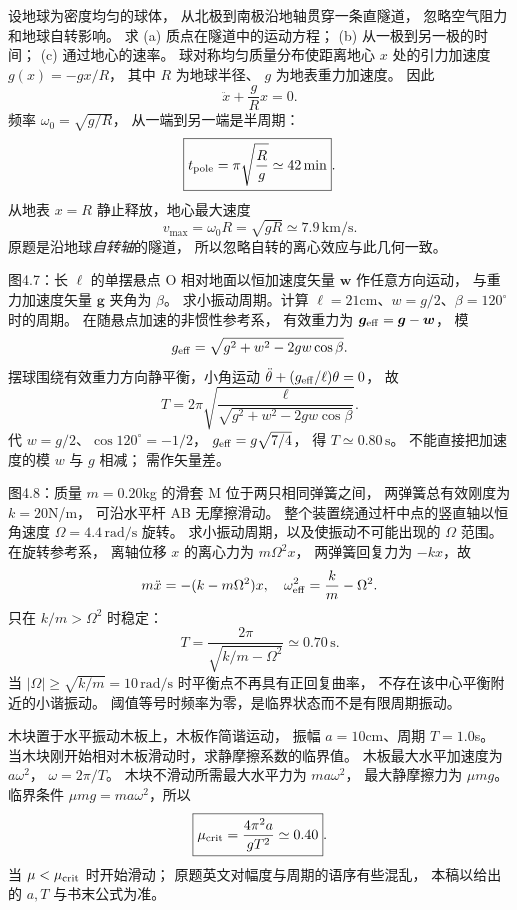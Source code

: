 设地球为密度均匀的球体，
从北极到南极沿地轴贯穿一条直隧道，
忽略空气阻力和地球自转影响。
求 (a) 质点在隧道中的运动方程；
(b) 从一极到另一极的时间；
(c) 通过地心的速率。
\exsolution
球对称均匀质量分布使距离地心 $x$ 处的引力加速度
$g(x)=-gx/R$，
其中 $R$ 为地球半径、
$g$ 为地表重力加速度。
因此
\[
\boxed{\ddot x+\frac gR x=0}.
\]
频率 $\omega_0=\sqrt{g/R}$，
从一端到另一端是半周期：
\[
\boxed{t_{\rm pole}=\pi\sqrt{\frac Rg}
\simeq42\,\mathrm{min}}.
\]
从地表 $x=R$ 静止释放，地心最大速度
\[
\boxed{v_{\max}=\omega_0R=\sqrt{gR}
\simeq7.9\,\mathrm{km/s}}.
\]
\excheck 原题是沿地球\emph{自转轴}的隧道，
所以忽略自转的离心效应与此几何一致。

图4.7：长 $\ell$ 的单摆悬点 O 相对地面以恒加速度矢量
$\bm w$ 作任意方向运动，
与重力加速度矢量 $\bm g$ 夹角为 $\beta$。
求小振动周期。计算
$\ell=21$cm、$w=g/2$、$\beta=120^\circ$ 时的周期。
\exsolution
在随悬点加速的非惯性参考系，
有效重力为
$\bm g_{\rm eff}=\bm g-\bm w$，
模
\[
g_{\rm eff}=\sqrt{g^2+w^2-2gw\cos\beta}.
\]
摆球围绕有效重力方向静平衡，小角运动
$\ddot\theta+(g_{\rm eff}/\ell)\theta=0$，
故
\[
\boxed{T=2\pi\sqrt{\frac{\ell}
{\sqrt{g^2+w^2-2gw\cos\beta}}}}.
\]
代 $w=g/2$、$\cos120^\circ=-1/2$，
$g_{\rm eff}=g\sqrt{7/4}$，
得
$\boxed{T\simeq0.80\,\mathrm s}$。
\excheck 不能直接把加速度的模 $w$ 与 $g$ 相减；
需作矢量差。

图4.8：质量 $m=0.20$kg 的滑套 M 位于两只相同弹簧之间，
两弹簧总有效刚度为 $k=20$N/m，
可沿水平杆 AB 无摩擦滑动。
整个装置绕通过杆中点的竖直轴以恒角速度
$\Omega=4.4\,\mathrm{rad/s}$ 旋转。
求小振动周期，以及使振动不可能出现的 $\Omega$ 范围。
\exsolution
在旋转参考系，
离轴位移 $x$ 的离心力为 $m\Omega^2x$，
两弹簧回复力为 $-kx$，故
\[
m\ddot x=-(k-m\Omega^2)x,
\quad
\omega_{\rm eff}^2=\frac km-\Omega^2.
\]
只在 $k/m>\Omega^2$ 时稳定：
\[
\boxed{T=\frac{2\pi}{\sqrt{k/m-\Omega^2}}
\simeq0.70\,\mathrm s}.
\]
当
$\boxed{|\Omega|\ge\sqrt{k/m}=10\,\mathrm{rad/s}}$
时平衡点不再具有正回复曲率，
不存在该中心平衡附近的小谐振动。
\excheck 阈值等号时频率为零，是临界状态而不是有限周期振动。

木块置于水平振动木板上，木板作简谐运动，
振幅 $a=10$cm、周期 $T=1.0$s。
当木块刚开始相对木板滑动时，求静摩擦系数的临界值。
\exsolution
木板最大水平加速度为
$a\omega^2$，
$\omega=2\pi/T$。
木块不滑动所需最大水平力为
$ma\omega^2$，
最大静摩擦力为 $\mu mg$。
临界条件
$\mu mg=ma\omega^2$，所以
\[
\boxed{\mu_{\rm crit}=\frac{4\pi^2a}{gT^2}
\simeq0.40}.
\]
\excheck 当 $\mu<\mu_{\rm crit}$ 时开始滑动；
原题英文对幅度与周期的语序有些混乱，
本稿以给出的 $a,T$ 与书末公式为准。

